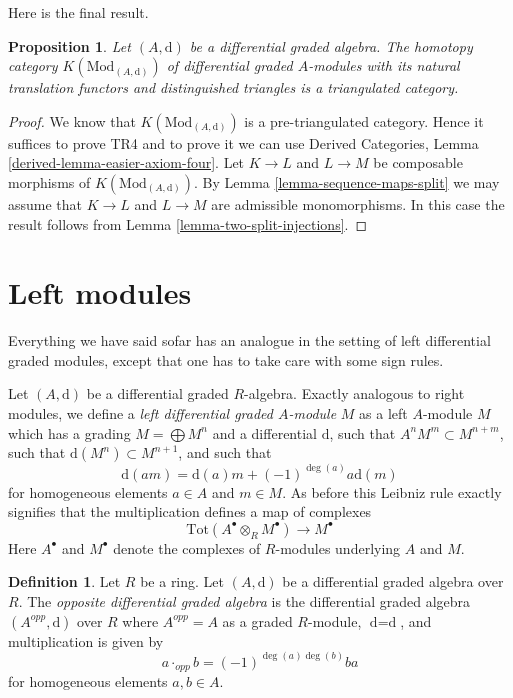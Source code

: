 \documentclass{stacks-project}
\theoremstyle{plain}
\newtheorem{proposition}[subsection]{Proposition}
\theoremstyle{definition}
\newtheorem{definition}[subsection]{Definition}
\theoremstyle{remark}
\numberwithin{equation}{subsection}
\begin{document}
\noindent
Here is the final result.

\begin{proposition}
\label{proposition-homotopy-category-triangulated}
Let $(A, \text{d})$ be a differential graded algebra. The homotopy category
$K(\text{Mod}_{(A, \text{d})})$ of differential graded $A$-modules with its
natural translation functors and distinguished triangles is a triangulated
category.
\end{proposition}

\begin{proof}
We know that $K(\text{Mod}_{(A, \text{d})})$ is a pre-triangulated category.
Hence it suffices to prove TR4 and to prove it we can use
Derived Categories, Lemma \ref{derived-lemma-easier-axiom-four}.
Let $K \to L$ and $L \to M$ be composable morphisms of
$K(\text{Mod}_{(A, \text{d})})$. By
Lemma \ref{lemma-sequence-maps-split} we may assume that
$K \to L$ and $L \to M$ are admissible monomorphisms.
In this case the result follows from
Lemma \ref{lemma-two-split-injections}.
\end{proof}











\section{Left modules}
\label{section-left-modules}

\noindent
Everything we have said sofar has an analogue in the setting
of left differential graded modules, except that one has to
take care with some sign rules.

\medskip\noindent
Let $(A, \text{d})$ be a differential graded $R$-algebra.
Exactly analogous to right modules, we define a
{\it left differential graded $A$-module} $M$ as a left
$A$-module $M$ which has a grading $M = \bigoplus M^n$
and a differential $\text{d}$, such that $A^n M^m \subset M^{n + m}$,
such that $\text{d}(M^n) \subset M^{n + 1}$, and such that
$$
\text{d}(am) = \text{d}(a) m + (-1)^{\deg(a)}a \text{d}(m)
$$
for homogeneous elements $a \in A$ and $m \in M$. As before this
Leibniz rule exactly signifies that the multiplication defines
a map of complexes
$$
\text{Tot}(A^\bullet \otimes_R M^\bullet) \to M^\bullet
$$
Here $A^\bullet$ and $M^\bullet$ denote the complexes of $R$-modules
underlying $A$ and $M$.

\begin{definition}
\label{definition-opposite-dga}
Let $R$ be a ring. Let $(A, \text{d})$ be a differential graded algebra
over $R$. The {\it opposite differential graded algebra} is the differential
graded algebra $(A^{opp}, \text{d})$ over $R$ where $A^{opp} = A$
as a graded $R$-module, $\text{d} = \text{d}$, and multiplication is
given by
$$
a \cdot_{opp} b = (-1)^{\deg(a)\deg(b)} b a
$$
for homogeneous elements $a, b \in A$.
\end{definition}
\end{document}
